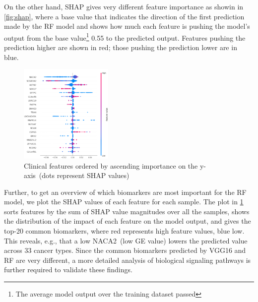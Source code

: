 \hspace*{3.5mm} On the other hand, SHAP gives very different feature importance as showin in \cref{fig:shap}, where a base value that indicates the direction of the first prediction made by the RF model and shows how much each feature is pushing the model's output from the base value\footnote{The average model output over the training dataset passed} 0.55 to the predicted output. Features pushing the prediction higher are shown in red; those pushing the prediction lower are in blue.

\begin{figure}[h]
\centering
	\includegraphics[width=0.4\textwidth]{images/fi.png}
	\caption{Clinical features ordered by ascending importance on the y-axis~(dots represent SHAP values)} 
	\label{fig:shap_FI}
	\vspace{-2mm}
\end{figure}

\hspace*{3.5mm} Further, to get an overview of which biomarkers are most important for the RF model, we plot the SHAP values of each feature for each sample. The plot in \cref{fig:shap_FI} sorts features by the sum of SHAP value magnitudes over all the samples, shows the distribution of the impact of each feature on the model output, and gives the top-20 common biomarkers, where red represents high feature values, blue low. This reveals, e.g., that a low NACA2~(low GE value) lowers the predicted value across 33 cancer types. Since the common biomarkers predicted by VGG16 and RF are very different, a more detailed analysis of biological signaling pathways is further required to validate these findings. 

